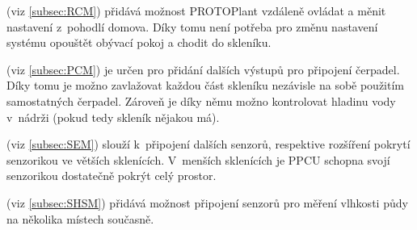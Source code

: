 \noindent{} (viz \autoref{subsec:RCM}) přidává možnost PROTOPlant vzdáleně ovládat a měnit nastavení z~pohodlí domova.
Díky tomu není potřeba pro změnu nastavení systému opouštět obývací pokoj a chodit do skleníku. \newline

\noindent{} (viz \autoref{subsec:PCM}) je určen pro přidání dalších výstupů pro připojení čerpadel.
Díky tomu je možno zavlažovat každou část skleníku nezávisle na sobě použitím samostatných čerpadel. 
Zároveň je díky němu možno kontrolovat hladinu vody v~nádrži (pokud tedy skleník nějakou má).\newline

\noindent{} (viz \autoref{subsec:SEM}) slouží k~připojení dalších senzorů, respektive rozšíření pokrytí senzorikou ve větších sklenících.
V~menších sklenících je PPCU schopna svojí senzorikou dostatečně pokrýt celý prostor.\newline

\noindent{} (viz \autoref{subsec:SHSM}) přidává možnost připojení senzorů pro měření vlhkosti půdy na několika místech současně.\newline

\newpage